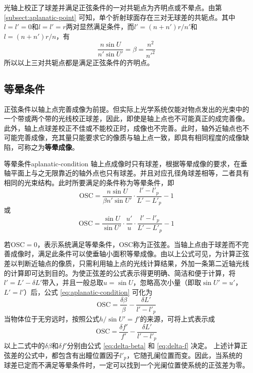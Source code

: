 光轴上校正了球差并满足正弦条件的一对共轭点为齐明点或不晕点。由第 \ref{subsect:aplanatic-point} 可知，单个折射球面存在三对无球差的共轭点。其中$l=l'=0$和$l=l'=r$两对显然满足条件，而$l'=(n+n')r/n'$和$l=(n+n')r/n$，有
\begin{equation}
\frac{n\sin U}{n'\sin U'}=\beta=\frac{n^2}{n'^2}
\end{equation}
所以以上三对共轭点都是满足正弦条件的齐明点。

\subsection{等晕条件}
正弦条件以轴上点完善成像为前提。但实际上光学系统仅能对物点发出的光束中的一个带或两个带的光线校正球差，因此，即使是轴上点也不可能真正的成完善像。此外，轴上点球差校正不佳或不能校正时，成像也不完善。此时，轴外近轴点也不可能完善成像，充其量只能要求它的像质与轴上点一致，即具有相同程度的成像缺陷，可称之为\textbf{等晕成像}。

\begin{definition}{等晕条件}{aplanatic-condition}
	轴上点成像时只有球差，根据等晕成像的要求，在垂轴平面上与之无限靠近的轴外点也只有球差。并且对应孔径角球差相等，二者具有相同的光束结构。此时所要满足的条件称为等晕条件，即
	\begin{equation}
	\mathrm{OSC}=\frac{n\sin U}{\beta n'\sin U'}\cdot\frac{l'-l'_p}{L'-L'_p}-1
	\end{equation}
	或
	\begin{equation}
	\mathrm{OSC}=\frac{\sin U}{\sin U'}\cdot\frac{u'}{u}\cdot\frac{l'-l'_p}{L'-L'_p}-1
	\label{eq:aplanatic-condition}
	\end{equation}
\end{definition}
若$\mathrm{OSC}=0$，表示系统满足等晕条件，$\mathrm{OSC}$称为正弦差。当轴上点由于球差而不完善成像时，满足此条件可以使垂轴小面积等晕成像。由以上公式可见，为计算正弦差以判断近轴点的像质，只需利用轴上点的光线计算结果，外加一条第二近轴光线的计算即可达到目的。为使正弦差的公式表示得更明确、简洁和便于计算，将$l'=L'-\delta L'$带入，并且一般总取$u=\sin U$，忽略高次小量（即取$\sin U'=u'$，$L'=l'$）后，公式 \eqref{eq:aplanatic-condition} 可化为
\begin{equation}
\mathrm{OSC}=\frac{\delta\beta}{\beta}-\frac{\delta L'}{l'-l'_p}
\end{equation}
当物体位于无穷远时，按照公式$h/\sin U'=f'$的来源，可将上式表示成
\begin{equation}
\mathrm{OSC}=\frac{\delta f'}{f'}-\frac{\delta L'}{l'-l'_p}
\end{equation}
以上二式中的$\delta\beta$和$\delta f'$分别由公式 \eqref{eq:delta-beta} 和 \eqref{eq:delta-f} 决定。
上述计算正弦差的公式中，都包含有出瞳位置因子$l'_p$，它随孔阑位置而变。因此，当系统的球差已定而不满足等晕条件时，一定可以找到一个光阑位置使系统的正弦差为零。

